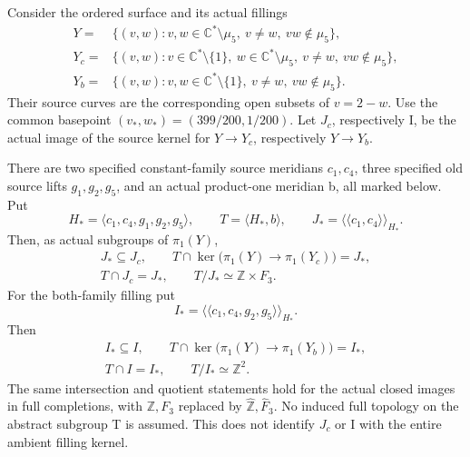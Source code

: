 Consider the ordered surface and its actual fillings
\[
\begin{split}
Y={}&\{(v,w):v,w\in\mathbb C^*\setminus\mu _5,\
                    v\ne w,\ vw\notin\mu _5\},\\
Y_c={}&\{(v,w):v\in\mathbb C^*\setminus\{1\},\
                 w\in\mathbb C^*\setminus\mu _5,\
                    v\ne w,\ vw\notin\mu _5\},\\
Y_b={}&\{(v,w):v,w\in\mathbb C^*\setminus\{1\},\
                    v\ne w,\ vw\notin\mu _5\}.
\end{split}
\tag{B.83.1}
\]
Their source curves are the corresponding open subsets of \(v=2-w\).
Use the common basepoint \((v_*,w_*)=(399/200,1/200)\).
Let \(J_c\), respectively I, be the actual image of the source
kernel for \(Y\to Y_c\), respectively \(Y\to Y_b\).

There are two specified constant-family source meridians \(c_1,c_4\),
three specified old source lifts \(g_1,g_2,g_5\), and an actual
product-one meridian b, all marked below. Put
\[
 H_*=\langle c_1,c_4,g_1,g_2,g_5\rangle,\qquad
 T=\langle H_*,b\rangle,\qquad
 J_*=\langle\!\langle c_1,c_4\rangle\!\rangle_{H_*}.
\tag{B.83.2}
\]
Then, as actual subgroups of \(\pi _1(Y)\),
\[
\begin{gathered}
 J_*\subseteq J_c,\qquad
 T\cap\ker\bigl(\pi _1(Y)\to\pi _1(Y_c)\bigr)=J_*,\\
 T\cap J_c=J_*,\qquad T/J_*\simeq\mathbb Z\times F_3.
\end{gathered}
\tag{B.83.3}
\]
For the both-family filling put
\[
 I_*=\langle\!\langle c_1,c_4,g_2,g_5\rangle\!\rangle_{H_*}.
\tag{B.83.4}
\]
Then
\[
\begin{gathered}
 I_*\subseteq I,\qquad
 T\cap\ker\bigl(\pi _1(Y)\to\pi _1(Y_b)\bigr)=I_*,\\
 T\cap I=I_*,\qquad T/I_*\simeq\mathbb Z^2.
\end{gathered}
\tag{B.83.5}
\]
The same intersection and quotient statements hold for the actual
closed images in full completions, with \(\mathbb Z,F_3\) replaced
by \(\widehat{\mathbb Z},\widehat F_3\). No induced full topology
on the abstract subgroup T is assumed. This does not identify
\(J_c\) or I with the entire ambient filling kernel.

